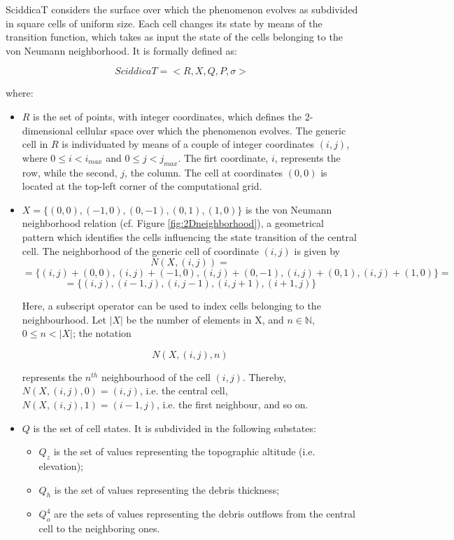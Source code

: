 SciddicaT considers the surface over which the phenomenon evolves as
subdivided in square cells of uniform size. Each cell changes its
state by means of the transition function, which takes as input the
state of the cells belonging to the von Neumann neighborhood. It is
formally defined as:

$$SciddicaT = < R, X, Q , P, \sigma  >$$

where:

\begin{itemize}

\item $R$ is the set of points, with integer coordinates, which
  defines the 2-dimensional cellular space over which the phenomenon
  evolves. The generic cell in $R$ is individuated by means of a
  couple of integer coordinates $(i, j)$, where $0 \leq i < i_{max}$
  and $0 \leq j < j_{max}$. The firt coordinate, $i$, represents the
  row, while the second, $j$, the column. The cell at coordinates
  $(0,0)$ is located at the top-left corner of the computational grid.

\item $X = \{(0,0), (-1, 0), (0, -1), (0, 1), (1, 0)\}$ is the von
  Neumann neighborhood relation (cf. Figure \ref{fig:2Dneighborhood}), a
  geometrical pattern which identifies the cells influencing the state
  transition of the central cell. The neighborhood of the generic cell
  of coordinate $(i, j)$ is given by
$$N(X, (i, j)) =$$
$$= \{(i, j)+(0,0), (i, j)+(-1, 0), (i, j)+(0, -1),
(i, j)+(0, 1), (i, j)+(1, 0)\} =$$
$$= \{(i, j), (i-1, j), (i, j-1), (i, j+1), (i+1, j)\}$$

Here, a subscript operator can be used to index cells belonging to the
neighbourhood. Let $|X|$ be the number of elements in X, and $n \in
\mathbb{N}$, $0 \leq n < |X|$; the notation

$$N(X, (i, j), n)$$

represents the $n^{th}$ neighbourhood of the cell $(i,j)$. Thereby, $N(X, (i, j), 0) = (i, j)$, i.e. the central cell, $N(X, (i, j), 1) = (i-1, j)$, i.e. the first neighbour, and so on. 
  
\item $Q$ is the set of cell states. It is subdivided in the following
  substates:

\begin{itemize}
    \item   $Q_z$ is the set of values representing the topographic altitude (i.e. elevation);
    \item   $Q_h$ is the set of values representing the debris thickness;
    \item   $Q_o^4$ are the sets of values representing the debris outflows from the central cell to the neighboring ones.
\end{itemize}


\end{itemize}
